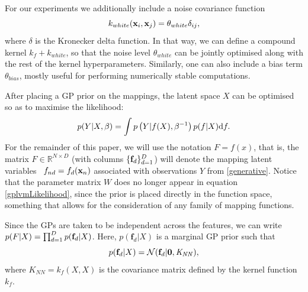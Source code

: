 \documentclass [10pt , a4paper]{article}
\begin{document}
\par For our experiments we additionally include a noise covariance function
\begin{equation}
\label{whiteNoise}
k_{white}(\mathbf{x}_i, \mathbf{x}_j) = \theta_{white} \delta_{ij},
\end{equation}
where $\delta$ is the Kronecker delta function. In that way, we can define a compound kernel $k_f + k_{white}$, so that
the noise level $\theta_{white}$ can be jointly optimised along with the rest of the kernel hyperparameters. Similarly,
one can also include a bias term $\theta_{bias}$, mostly useful for performing numerically stable computations.



\par After placing a GP prior on the mappings, the latent space $X$ can be optimised so as to maximise the likelihood:
\begin{equation}
 \label{gplvmLikelihood}
p(Y | X, \beta) = \int p \left( Y | f(X), \beta^{-1} \right) p(f | X) \text{d} f .
\end{equation}
For the remainder of this paper, we will use the notation $F = f(x)$, that is, the matrix $F \in \mathbb{R}^{N \times D}$ (with columns
$\{ \mathbf{f}_d \}_{d=1}^D$)
will denote the mapping latent variables \ $f_{nd} =f_d(\mathbf{x}_n)$
associated with observations $Y$ from \eqref{generative}. 
Notice that the parameter matrix $W$ does no longer appear in equation \eqref{gplvmLikelihood}, since the prior is placed 
directly in the function space, something that allows for the consideration of any family of mapping functions. 

\par Since the GPs are taken to be independent across the features, we can write 
$p(F | X) = \prod_{d=1}^D p(\mathbf{f}_d | X)$. Here,
$p(\mathbf{f}_d | \mathit{X})$ is a marginal GP prior 
such that 
\begin{equation}
\label{priorF}
p(\mathbf{f}_d | X) = \mathcal{N}(\mathbf{f}_d |\mathbf{0}, \mathit{K_{NN}}),
\end{equation}
where $\mathit{K}_{NN}= \mathit{k}_f(X,X)$ is the covariance matrix
defined by the kernel function $\mathit{k}_f$.
\end{document}
